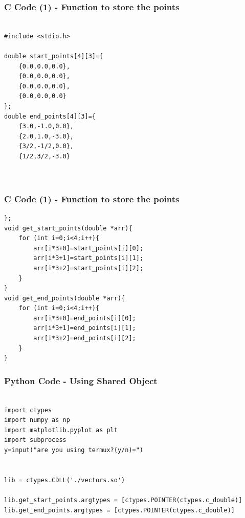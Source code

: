 \documentclass{beamer}
\begin{document}
\begin{frame}[fragile]
    \frametitle{C Code (1) - Function to store the points }

    \begin{lstlisting}

#include <stdio.h>
 
double start_points[4][3]={
	{0.0,0.0,0.0},
	{0.0,0.0,0.0},
	{0.0,0.0,0.0},
	{0.0,0.0,0.0}
};
double end_points[4][3]={
	{3.0,-1.0,0.0},
	{2.0,1.0,-3.0},
	{3/2,-1/2,0.0},
	{1/2,3/2,-3.0}



    \end{lstlisting}
\end{frame}
\begin{frame}[fragile]
    \frametitle{C Code (1) - Function to store the points }

    \begin{lstlisting}
};
void get_start_points(double *arr){
	for (int i=0;i<4;i++){
		arr[i*3+0]=start_points[i][0];
		arr[i*3+1]=start_points[i][1];
		arr[i*3+2]=start_points[i][2];
	}
}
void get_end_points(double *arr){
	for (int i=0;i<4;i++){
		arr[i*3+0]=end_points[i][0];
		arr[i*3+1]=end_points[i][1];
		arr[i*3+2]=end_points[i][2];
	}
}
 \end{lstlisting}
\end{frame}

\begin{frame}[fragile]
    \frametitle{Python Code - Using Shared Object}
    \begin{lstlisting}

import ctypes
import numpy as np
import matplotlib.pyplot as plt
import subprocess
y=input("are you using termux?(y/n)=")


lib = ctypes.CDLL('./vectors.so')

lib.get_start_points.argtypes = [ctypes.POINTER(ctypes.c_double)]
lib.get_end_points.argtypes = [ctypes.POINTER(ctypes.c_double)]



\end{lstlisting}
\end{frame}
\end{document}
